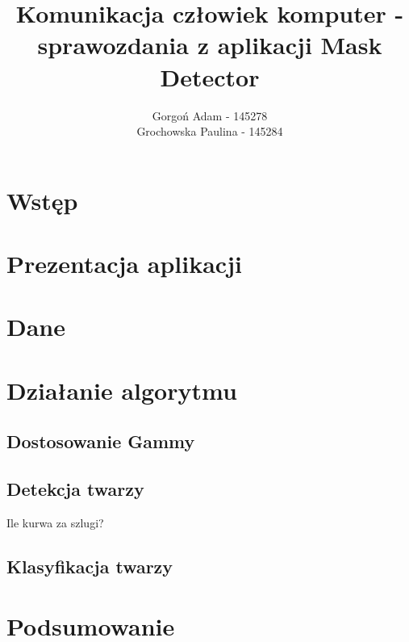 \documentclass[12pt]{article}
\title{Komunikacja człowiek komputer - sprawozdania z aplikacji Mask Detector}
\author{Gorgoń Adam - 145278\\Grochowska Paulina - 145284}
\begin{document}
	\maketitle
	
	\section{Wstęp}
	\section{Prezentacja aplikacji}
	\section{Dane}
	\section{Działanie algorytmu}
		\subsection{Dostosowanie Gammy}
		\subsection{Detekcja twarzy}
		Ile kurwa za szlugi?\cite{marx_kapital_1962}
		\subsection{Klasyfikacja twarzy}
	\section{Podsumowanie}
	
\end{document}
